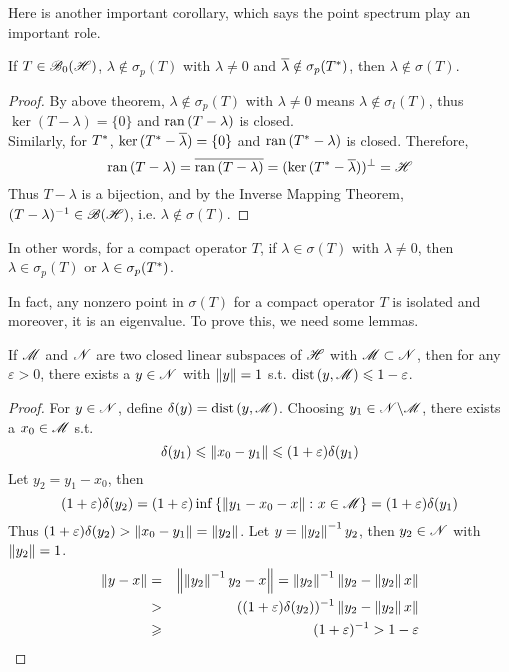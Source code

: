 Here is another important corollary, which says the point spectrum play an important role.
\begin{cor}
	If $T \in \mathscr{B}_{0}\mathscr{(H)}$, $\lambda \notin \sigma_p(T)$ with $\lambda \neq 0$ and $\overline{\lambda} \notin \sigma_p(T^{*})$, then $\lambda \notin \sigma(T)$.
\end{cor}
\begin{proof}
	By above theorem, $\lambda \notin \sigma_p(T)$ with $\lambda \neq 0$ means $\lambda \notin \sigma_l(T)$, thus $\ker{(T-\lambda)} = \{0\}$ and $\operatorname{ran}{(T-\lambda)}$ is closed.\\ Similarly, for $T^{*}$, $\ker{(T^{*}-\overline{\lambda})} = \{0\}$ and $\operatorname{ran}{(T^{*}-\lambda)}$ is closed. Therefore,
	\begin{equation*}
		\operatorname{ran}{(T-\lambda)} = \overline{\operatorname{ran}{(T-\lambda)}} = (\ker{(T^{*}-\overline{\lambda})})^{\bot} = \mathscr{H}
	\end{equation*}
	Thus $T-\lambda$ is a bijection, and by the Inverse Mapping Theorem, $(T-\lambda)^{-1} \in \mathscr{B(H)}$, i.e. $\lambda \notin \sigma(T)$.
\end{proof}
\begin{rem}
	In other words, for a compact operator $T$, if $\lambda \in \sigma(T)$ with $\lambda \neq 0$, then $\lambda \in \sigma_p(T)$ or $\lambda \in \sigma_p(T^{*})$.
\end{rem}

In fact, any nonzero point in $\sigma(T)$ for a compact operator $T$ is isolated and moreover, it is an eigenvalue. To prove this, we need some lemmas.

\begin{lem}
	If $\mathscr{M}$ and $\mathscr{N}$ are two closed linear subspaces of $\mathscr{H}$ with $\mathscr{M} \subset \mathscr{N}$, then for any $\varepsilon > 0$, there exists a $y \in \mathscr{N}$ with $\left\lVert y\right\lVert = 1$ s.t. $\operatorname{dist}{(y,\mathscr{M})} \leqslant 1-\varepsilon$.
\end{lem}
\begin{proof}
	For $y \in \mathscr{N}$, define $\delta(y) = \operatorname{dist}{(y,\mathscr{M})}$. Choosing $y_1 \in \mathscr{N} \backslash \mathscr{M}$, there exists a $x_0 \in \mathscr{M}$ s.t.
	\begin{equation*}
		\delta(y_1) \leqslant \left\lVert x_0-y_1\right\lVert \leqslant (1+\varepsilon)\delta(y_1)
	\end{equation*}
	Let $y_2 = y_1-x_0$, then
	\begin{equation*}
		(1+\varepsilon)\delta(y_2) = (1+\varepsilon)\operatorname{inf}{\{\left\lVert y_1-x_0-x\right\lVert \colon x \in \mathscr{M}\}} = (1+\varepsilon)\delta(y_1)
	\end{equation*}
	Thus $(1+\varepsilon)\delta(y_2) > \left\lVert x_0 - y_1\right\lVert = \left\lVert y_2\right\lVert$. Let $y = \left\lVert y_2\right\lVert^{-1}y_2$, then $y_2 \in \mathscr{N}$ with $\left\lVert y_2\right\lVert=1$.
	\begin{eqnarray*}
		\left\lVert y-x\right\lVert &=& \left\lVert\left\lVert y_2\right\lVert^{-1}y_2-x\right\lVert = \left\lVert y_2\right\lVert^{-1}\left\lVert y_2-\left\lVert y_2\right\lVert x\right\lVert \\
		&>& ((1+\varepsilon)\delta(y_2))^{-1} \left\lVert y_2-\left\lVert y_2\right\lVert x\right\lVert \\
		&\geqslant& (1+\varepsilon)^{-1} > 1 - \varepsilon
	\end{eqnarray*}
\end{proof}

